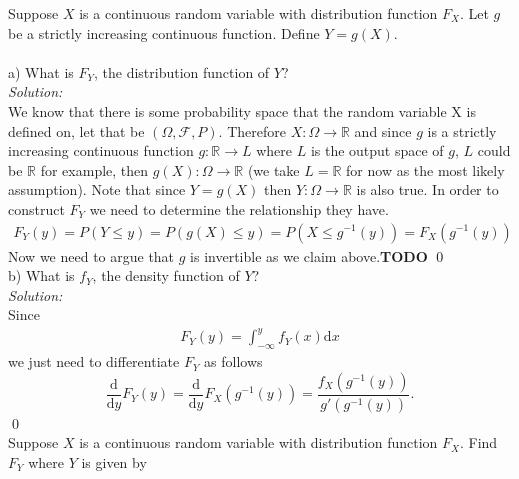\documentclass[10pt]{amsart}
\newcommand{\D}{\mathrm{d}}
\begin{document}
 Suppose $X$ is a continuous random variable with distribution function $F_X$. Let $g$ be a strictly increasing continuous function. Define $Y=g(X)$. \\ \\
\noindent
a) What is $F_Y$, the distribution function of $Y$? \\
\textit{Solution:} \\
We know that there is some probability space that the random variable X is defined on, let that be $(\Omega, \mathcal{F},P)$.
Therefore $X: \Omega \rightarrow \mathbb{R}$ and since $g$ is a strictly increasing continuous function $g: \mathbb{R} \rightarrow L$ where $L$ is the output space of $g$, $L$ could be $\mathbb{R}$ for example, then $g(X): \Omega \rightarrow \mathbb{R}$ (we take $L = \mathbb{R}$ for now as the most likely assumption).
Note that since $Y = g(X)$ then $Y: \Omega \rightarrow \mathbb{R}$ is also true.
In order to construct $F_Y$ we need to determine the relationship they have.
\begin{eqnarray*}
F_Y(y) = P(Y \leq y) = P(g(X) \leq y) = P(X \leq g^{-1}(y)) = F_X(g^{-1}(y))
\end{eqnarray*}
Now we need to argue that $g$ is invertible as we claim above.\textbf{TODO}
\qed \\

\noindent
b) What is $f_Y$, the density function of $Y$? \\
\textit{Solution:} \\
Since
\begin{align*}
F_Y(y) = \int_{-\infty}^y f_Y(x) \D x
\end{align*}
we just need to differentiate $F_Y$ as follows \\
$$
\frac{\D}{\D y} F_Y(y) = \frac{\D}{\D y} F_X(g^{-1}(y)) = \frac{f_X(g^{-1}(y))}{g\prime(g^{-1}(y))}.
$$
\qed
\\

 Suppose $X$ is a continuous random variable with distribution function $F_X$. Find $F_Y$ where $Y$ is given by \\
\end{document}
